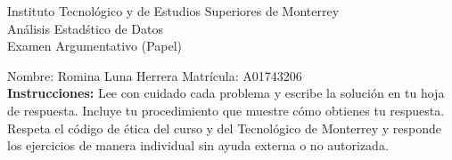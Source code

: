 \documentclass[10pt]{report}
\begin{document}
\newpage



\begin{center}
{\large Instituto Tecnol\'{o}gico y de Estudios Superiores de Monterrey \\
An\'alisis Estad\'stico de Datos } \\
Examen Argumentativo (Papel)
\end{center}

Nombre: \underline{\hspace*{.2in}}
Romina Luna Herrera
\underline{\hspace*{.2in}} \quad Matr\'icula:\underline{\hspace*{.2in}}
A01743206
\underline{\hspace*{.2in}} \\

{\bf Instrucciones:} Lee con cuidado cada problema y escribe la soluci\'on
en tu hoja de respuesta. Incluye tu procedimiento que muestre c\'omo obtienes tu respuesta.  Respeta el c\'odigo de \'etica del curso y del Tecnol\'ogico de Monterrey y responde los ejercicios de manera individual sin ayuda externa o no autorizada.
\end{document}
